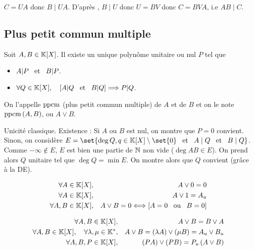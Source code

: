 \documentclass{magnolia}
\begin{document}
\begin{preuve}
$C=UA$ donc $B\mid UA$. D'après , $B\mid U$ donc $U=BV$ donc $C=BVA$, i.e $AB\mid C$.
\end{preuve}
\subsection{Plus petit commun multiple}

\begin{definition}
Soit $A,B\in\polyK$. Il existe un unique polynôme unitaire ou nul $P$ tel que
\begin{itemize}
\item $A|P \quad\!\text{et}\quad\! B|P$.
\item $\forall Q\in\polyK \qsep \cro{A|Q \et B|Q} \implique P|Q$.
\end{itemize}
On l'appelle $\operatorname{ppcm}$ (plus petit commun multiple) de $A$ et de $B$ et on le note
$\operatorname{ppcm}\left(A,B\right)$, ou $A\vee B$.
\end{definition}

\begin{preuve}
Unicité classique.
Existence : Si $A$ ou $B$ est nul, on montre que $P=0$ convient. Sinon, on considère $E=\set{\deg Q, q\in \polyK\setminus\set{0} \et A\mid Q \et B\mid Q}$. Comme $-\infty\notin E$, $E$ est bien une partie de $\mathbb{N}$ non vide ($\deg AB \in E$). On prend alors $Q$ unitaire tel que $\deg Q=\min E$. On montre alors que $Q$ convient (grâce à la DE).
\end{preuve}

\begin{proposition}
\begin{eqnarray*}
\forall A\in\polyK, & & A\vee 0=0\\
\forall A\in\polyK,& & A\vee 1=A_u\\
\forall A,B\in\polyK, & & A\vee B=0 \ssi \cro{A=0 \ou B=0}
\end{eqnarray*}
\end{proposition}

\begin{proposition}
\begin{eqnarray*}
\forall A,B\in\polyK, & & A\vee B=B\vee A\\
\forall A,B\in\polyK \qsep \forall \lambda,\mu\in\Ks, & &
  A\vee B=\p{\lambda A}\vee\p{\mu B}=A_u\vee B_u\\
\forall A,B,P\in\polyK, & & \p{PA}\vee\p{PB}=P_u\p{A\vee B}
\end{eqnarray*}
\end{proposition}
\end{document}
